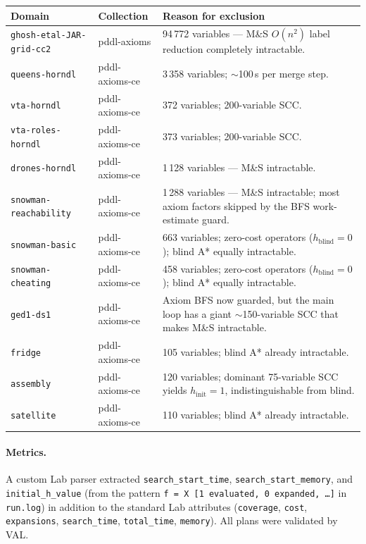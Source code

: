 \documentclass[11pt,a4paper]{article}
\begin{document}
\begin{center}
\small
\begin{tabular}{llp{7cm}}
\toprule
\textbf{Domain} & \textbf{Collection} & \textbf{Reason for exclusion} \\
\midrule
\texttt{ghosh-etal-JAR-grid-cc2} & pddl-axioms
  & 94\,772 variables --- M\&S $O(n^2)$ label reduction completely intractable. \\
\texttt{queens-horndl}           & pddl-axioms-ce
  & 3\,358 variables; $\sim$100\,s per merge step. \\
\texttt{vta-horndl}              & pddl-axioms-ce
  & 372 variables; 200-variable SCC. \\
\texttt{vta-roles-horndl}        & pddl-axioms-ce
  & 373 variables; 200-variable SCC. \\
\texttt{drones-horndl}           & pddl-axioms-ce
  & 1\,128 variables --- M\&S intractable. \\
\texttt{snowman-reachability}    & pddl-axioms-ce
  & 1\,288 variables --- M\&S intractable; most axiom factors skipped
    by the BFS work-estimate guard. \\
\texttt{snowman-basic}           & pddl-axioms-ce
  & 663 variables; zero-cost operators ($h_{\mathrm{blind}}=0$);
    blind A* equally intractable. \\
\texttt{snowman-cheating}        & pddl-axioms-ce
  & 458 variables; zero-cost operators ($h_{\mathrm{blind}}=0$);
    blind A* equally intractable. \\
\texttt{ged1-ds1}                & pddl-axioms-ce
  & Axiom BFS now guarded, but the main loop has a giant
    $\sim$150-variable SCC that makes M\&S intractable. \\
\texttt{fridge}                  & pddl-axioms-ce
  & 105 variables; blind A* already intractable. \\
\texttt{assembly}                & pddl-axioms-ce
  & 120 variables; dominant 75-variable SCC yields
    $h_{\mathrm{init}}=1$, indistinguishable from blind. \\
\texttt{satellite}               & pddl-axioms-ce
  & 110 variables; blind A* already intractable. \\
\bottomrule
\end{tabular}
\end{center}

\paragraph{Metrics.}
A custom Lab parser extracted \texttt{search\_start\_time},
\texttt{search\_start\_memory}, and \texttt{initial\_h\_value}
(from the pattern \texttt{f = X [1 evaluated, 0 expanded, \ldots]} in
\texttt{run.log}) in addition to the standard Lab attributes
(\texttt{coverage}, \texttt{cost}, \texttt{expansions}, \texttt{search\_time},
\texttt{total\_time}, \texttt{memory}).  All plans were validated by VAL.
\end{document}
